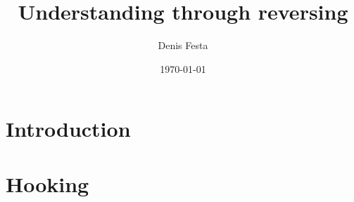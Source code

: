 \documentclass[10pt, twocolumn, a4paper]{article}
\begin{document}
\title{Understanding through reversing}
\author{Denis Festa}
\date{\today}

\maketitle

\tableofcontents

\section{Introduction}
%
%
%
%
%
%
\section{Hooking}


\end{document}

